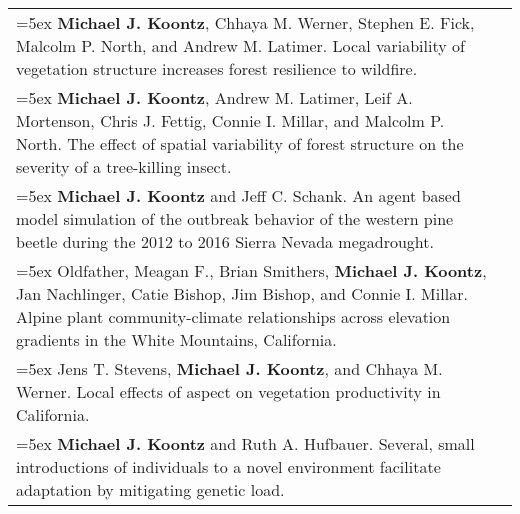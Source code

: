 \begin{longtable}{@{} >{\raggedright}p{5.25in} >{\raggedleft}X @{}}

\hangindent=5ex \textbf{Michael J. Koontz}, Chhaya M. Werner, Stephen E. Fick, Malcolm P. North, and Andrew M. Latimer. Local variability of vegetation structure increases forest resilience to wildfire. & [\textcolor{blue}{\href{https://github.com/mikoontz/remote-sensing-resistance}{GitHub}}] \tabularnewline

\hangindent=5ex \textbf{Michael J. Koontz}, Andrew M. Latimer, Leif A. Mortenson, Chris J. Fettig, Connie I. Millar, and Malcolm P. North. The effect of spatial variability of forest structure on the severity of a tree-killing insect. & [\textcolor{blue}{\href{https://github.com/mikoontz/local-structure-wpb-severity}{GitHub}}] \tabularnewline

\hangindent=5ex \textbf{Michael J. Koontz} and Jeff C. Schank. An agent based model simulation of the outbreak behavior of the western pine beetle during the 2012 to 2016 Sierra Nevada megadrought. & [\textcolor{blue}{\href{https://github.com/mikoontz/wpb-forest-structure-abm}{GitHub}}] \tabularnewline

\hangindent=5ex Oldfather, Meagan F., Brian Smithers, \textbf{Michael J. Koontz}, Jan Nachlinger, Catie Bishop, Jim Bishop, and Connie I. Millar. Alpine plant community-climate relationships across elevation gradients in the White Mountains, California.  & \tabularnewline

\hangindent=5ex Jens T. Stevens, \textbf{Michael J. Koontz}, and Chhaya M. Werner.
Local effects of aspect on vegetation productivity in California.  & \tabularnewline

\hangindent=5ex \textbf{Michael J. Koontz} and Ruth A. Hufbauer.
Several, small introductions of individuals to a novel environment facilitate adaptation by mitigating genetic load. & [\textcolor{blue}{\href{https://github.com/mikoontz/ppp-adaptation}{GitHub}}] \tabularnewline

\end{longtable}


